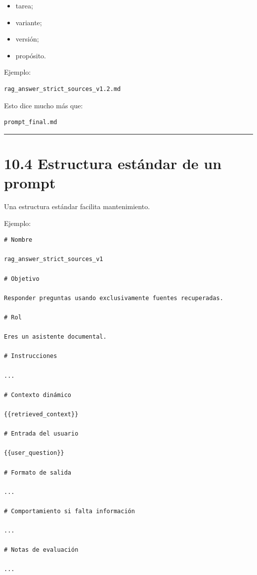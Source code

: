 \begin{itemize}
\tightlist
\item
  tarea;
\item
  variante;
\item
  versión;
\item
  propósito.
\end{itemize}

Ejemplo:

\begin{lstlisting}
rag_answer_strict_sources_v1.2.md
\end{lstlisting}

Esto dice mucho más que:

\begin{lstlisting}
prompt_final.md
\end{lstlisting}

\begin{center}\rule{0.5\linewidth}{0.5pt}\end{center}

\section{10.4 Estructura estándar de un
prompt}\label{estructura-estuxe1ndar-de-un-prompt}

Una estructura estándar facilita mantenimiento.

Ejemplo:

\begin{lstlisting}
# Nombre

rag_answer_strict_sources_v1

# Objetivo

Responder preguntas usando exclusivamente fuentes recuperadas.

# Rol

Eres un asistente documental.

# Instrucciones

...

# Contexto dinámico

{{retrieved_context}}

# Entrada del usuario

{{user_question}}

# Formato de salida

...

# Comportamiento si falta información

...

# Notas de evaluación

...
\end{lstlisting}

